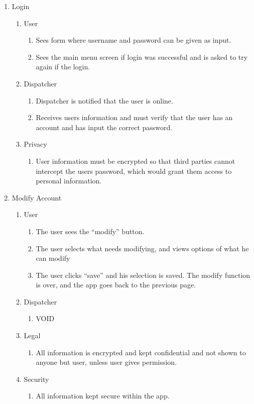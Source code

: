 \documentclass[english]{article}
\begin{document}
\begin{enumerate}[{BE}1.]
	\item Login
	\begin{enumerate}[{VP3}.1]
		\item User
			\begin{enumerate}
				\item Sees form where username and password can be given as input.
				\item Sees the main menu screen if login was successful and is asked to try again if the login.
			\end{enumerate}
		\item Dispatcher
			\begin{enumerate}
				\item Dispatcher is notified that the user is online.
				\item Receives users information and must verify that the user has an account and has input the correct password.
			\end{enumerate}
		\item Privacy
			\begin{enumerate}
				\item User information must be encrypted so that third parties cannot intercept the users password, which would grant them access to personal information.
			\end{enumerate}
	\end{enumerate}

	\item Modify Account	
	\begin{enumerate}[{VP4}.1]
		\item User
			\begin{enumerate}
				\item The user sees the “modify” button.
				\item The user selects what needs modifying, and views options of what he can modify
				\item The user clicks “save” and his selection is saved. The modify function is over, and the app goes back to the previous page.
			\end{enumerate}
		\item Dispatcher
			\begin{enumerate}
				\item VOID
			\end{enumerate}
		\item Legal
			\begin{enumerate}
				\item All information is encrypted and kept confidential and not shown to anyone but user, unless user gives permission.
			\end{enumerate}
			\item Security
			\begin{enumerate}
				\item All information kept secure within the app.
			\end{enumerate}
	\end{enumerate}


\end{enumerate}
\end{document}
